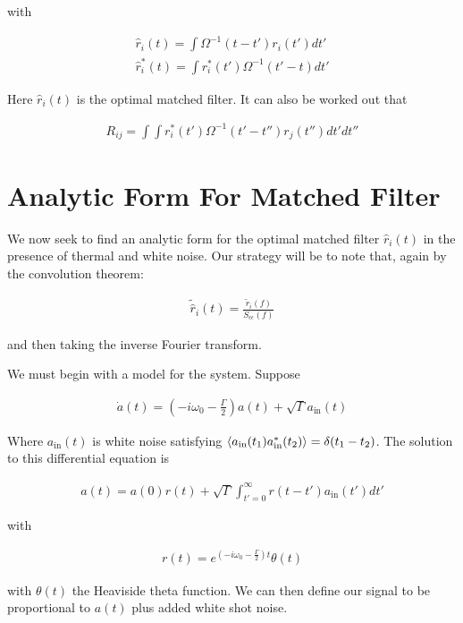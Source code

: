 \documentclass[12pt]{article}
\begin{document}
with

\begin{align}
\hat{r}_i(t) = \int \Omega^{-1}(t-t')r_i(t') dt'\\
\hat{r}^*_i(t) = \int r_i^*(t') \Omega^{-1}(t'-t) dt'
\end{align}

Here $\hat{r}_i(t)$ is the optimal matched filter.
It can also be worked out that

\begin{align}
R_{ij} = \int \int r^*_i(t') \Omega^{-1}(t'-t'') r_j(t'') dt' dt''
\end{align}

\section{Analytic Form For Matched Filter}

We now seek to find an analytic form for the optimal matched filter $\hat{r}_i(t)$ in the presence of thermal and white noise. Our strategy will be to note that, again by the convolution theorem:

\begin{align}
\tilde{\hat{r}}_i(t) = \frac{\tilde{r}_i(f)}{S_{\epsilon \epsilon}(f)}
\end{align}

and then taking the inverse Fourier transform.

 We must begin with a model for the system. Suppose

\begin{align}
\dot{a}(t) = \left(-i \omega_0 - \frac{\Gamma}{2}\right) a(t) + \sqrt{\Gamma}a_{\text{in}}(t)
\end{align}

Where $a_{\text{in}}(t)$ is white noise satisfying $\Braket{a_{\text{in}}(t_1)a^*_{\text{in}}(t_2)} = \delta(t_1-t_2)$. The solution to this differential equation is

\begin{align}
a(t) = a(0) r(t) + \sqrt{\Gamma} \int_{t'=0}^{\infty} r(t-t')a_{\text{in}}(t')dt'
\end{align}

with

\begin{align}
r(t) = e^{\left(-i \omega_0 - \frac{\Gamma}{2}\right) t} \theta(t)
\end{align}

with $\theta(t)$ the Heaviside theta function. We can then define our signal to be proportional to $a(t)$ plus added white shot noise.
\end{document}
